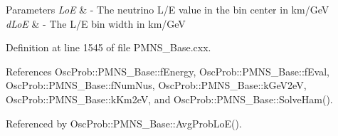 \begin{DoxyParams}{Parameters}
{\em LoE} & -\/ The neutrino L/E value in the bin center in km/\+GeV \\
\hline
{\em d\+LoE} & -\/ The L/E bin width in km/\+GeV \\
\hline
\end{DoxyParams}


Definition at line 1545 of file P\+M\+N\+S\+\_\+\+Base.\+cxx.



References Osc\+Prob\+::\+P\+M\+N\+S\+\_\+\+Base\+::f\+Energy, Osc\+Prob\+::\+P\+M\+N\+S\+\_\+\+Base\+::f\+Eval, Osc\+Prob\+::\+P\+M\+N\+S\+\_\+\+Base\+::f\+Num\+Nus, Osc\+Prob\+::\+P\+M\+N\+S\+\_\+\+Base\+::k\+Ge\+V2eV, Osc\+Prob\+::\+P\+M\+N\+S\+\_\+\+Base\+::k\+Km2eV, and Osc\+Prob\+::\+P\+M\+N\+S\+\_\+\+Base\+::\+Solve\+Ham().



Referenced by Osc\+Prob\+::\+P\+M\+N\+S\+\_\+\+Base\+::\+Avg\+Prob\+Lo\+E().


